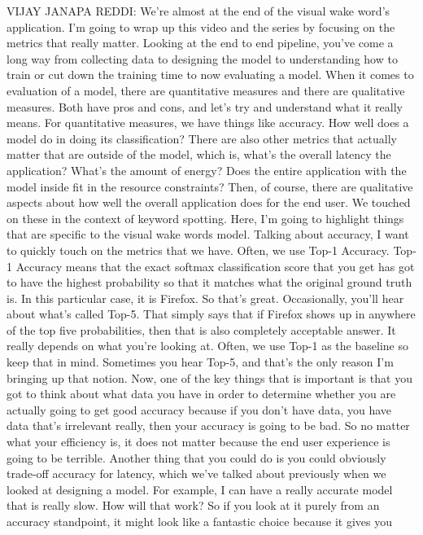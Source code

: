 VIJAY JANAPA REDDI: We're almost at the end of the visual wake word's
application.
I'm going to wrap up this video and the series
by focusing on the metrics that really matter.
Looking at the end to end pipeline, you've
come a long way from collecting data to designing
the model to understanding how to train or cut down the training
time to now evaluating a model.
When it comes to evaluation of a model, there are quantitative measures
and there are qualitative measures.
Both have pros and cons, and let's try and understand what it really means.
For quantitative measures, we have things like accuracy.
How well does a model do in doing its classification?
There are also other metrics that actually
matter that are outside of the model, which is, what's
the overall latency the application?
What's the amount of energy?
Does the entire application with the model inside fit in the resource
constraints?
Then, of course, there are qualitative aspects
about how well the overall application does for the end user.
We touched on these in the context of keyword spotting.
Here, I'm going to highlight things that are specific to the visual wake words
model.
Talking about accuracy, I want to quickly touch on the metrics
that we have.
Often, we use Top-1 Accuracy.
Top-1 Accuracy means that the exact softmax classification
score that you get has got to have the highest probability so that it matches
what the original ground truth is.
In this particular case, it is Firefox.
So that's great.
Occasionally, you'll hear about what's called Top-5.
That simply says that if Firefox shows up
in anywhere of the top five probabilities,
then that is also completely acceptable answer.
It really depends on what you're looking at.
Often, we use Top-1 as the baseline so keep that in mind.
Sometimes you hear Top-5, and that's the only reason
I'm bringing up that notion.
Now, one of the key things that is important
is that you got to think about what data you have in order to determine
whether you are actually going to get good accuracy because if you don't have
data, you have data that's irrelevant really, then your accuracy
is going to be bad.
So no matter what your efficiency is, it does not
matter because the end user experience is going to be terrible.
Another thing that you could do is you could obviously
trade-off accuracy for latency, which we've talked about previously
when we looked at designing a model.
For example, I can have a really accurate model that is really slow.
How will that work?
So if you look at it purely from an accuracy standpoint,
it might look like a fantastic choice because it gives you

